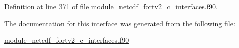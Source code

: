 Definition at line 371 of file module\+\_\+netcdf\+\_\+fortv2\+\_\+c\+\_\+interfaces.\+f90.



The documentation for this interface was generated from the following file\+:\begin{DoxyCompactItemize}
\item 
\hyperlink{module__netcdf__fortv2__c__interfaces_8f90}{module\+\_\+netcdf\+\_\+fortv2\+\_\+c\+\_\+interfaces.\+f90}\end{DoxyCompactItemize}
